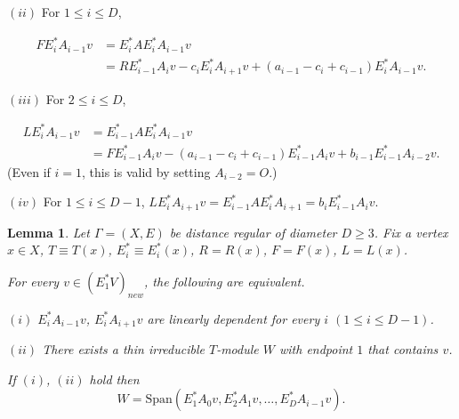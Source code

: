 \documentclass[
]{book}
\newtheorem{lemma}{Lemma}[chapter]
\theoremstyle{definition}
\theoremstyle{definition}
\theoremstyle{definition}
\theoremstyle{definition}
\theoremstyle{remark}
\begin{document}
\((ii)\) For \(1\leq i\leq D\),

\begin{align}
FE^*_iA_{i-1}v & = E^*_{i}AE^*_iA_{i-1}v\\
& = RE^*_{i-1}A_iv - c_iE^*_iA_{i+1}v + (a_{i-1}-c_i+c_{i-1})E^*_iA_{i-1}v.
\end{align}

\((iii)\) For \(2\leq i\leq D\),

\begin{align}
LE^*_iA_{i-1}v & = E^*_{i-1}AE^*_{i}A_{i-1}v\\
& = FE^*_{i-1}A_iv - (a_{i-1}-c_i+c_{i-1})E^*_{i-1}A_i v + b_{i-1}E^*_{i-1}A_{i-2}v.
\end{align}
(Even if \(i=1\), this is valid by setting \(A_{i-2}=O\).)

\((iv)\) For \(1\leq i\leq D-1\), \(LE^*_iA_{i+1}v = E^*_{i-1}AE^*_i A_{i+1} = b_iE^*_{i-1}A_iv\).

\begin{lemma}
\protect\hypertarget{lem:generator-endpoint1-mod}{}\label{lem:generator-endpoint1-mod}Let \(\Gamma = (X, E)\) be distance regular of diameter \(D\geq 3\). Fix a vertex \(x\in X\), \(T\equiv T(x)\), \(E^*_i\equiv E^*_i(x)\), \(R = R(x)\), \(F = F(x)\), \(L = L(x)\).

For every \(v\in (E^*_1V)_{new}\), the following are equivalent.

\((i)\) \(E^*_iA_{i-1}v\), \(E^*_{i}A_{i+1}v\) are linearly dependent for every \(i\) \((1\leq i\leq D-1)\).

\((ii)\) There exists a thin irreducible \(T\)-module \(W\) with endpoint \(1\) that contains \(v\).

If \((i)\), \((ii)\) hold then
\[W = \mathrm{Span}(E^*_1A_0v, E^*_2A_1v, \ldots, E^*_DA_{i-1}v).\]
\end{lemma}
\end{document}
